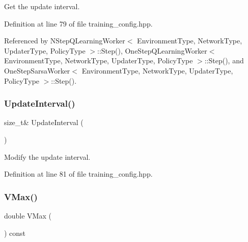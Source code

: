 Get the update interval. 



Definition at line 79 of file training\+\_\+config.\+hpp.



Referenced by N\+Step\+Q\+Learning\+Worker$<$ Environment\+Type, Network\+Type, Updater\+Type, Policy\+Type $>$\+::\+Step(), One\+Step\+Q\+Learning\+Worker$<$ Environment\+Type, Network\+Type, Updater\+Type, Policy\+Type $>$\+::\+Step(), and One\+Step\+Sarsa\+Worker$<$ Environment\+Type, Network\+Type, Updater\+Type, Policy\+Type $>$\+::\+Step().

\mbox{\label{classmlpack_1_1rl_1_1TrainingConfig_a8ff4385395b639358c1e392696a7469f}} 
\subsubsection{Update\+Interval()\hspace{0.1cm}{\footnotesize\ttfamily [2/2]}}
{\footnotesize\ttfamily size\+\_\+t\& Update\+Interval (\begin{DoxyParamCaption}{ }\end{DoxyParamCaption})\hspace{0.3cm}{\ttfamily [inline]}}



Modify the update interval. 



Definition at line 81 of file training\+\_\+config.\+hpp.

\mbox{\label{classmlpack_1_1rl_1_1TrainingConfig_af17fe4b8e0837c2280c72c08513a0da0}} 
\subsubsection{V\+Max()\hspace{0.1cm}{\footnotesize\ttfamily [1/2]}}
{\footnotesize\ttfamily double V\+Max (\begin{DoxyParamCaption}{ }\end{DoxyParamCaption}) const\hspace{0.3cm}{\ttfamily [inline]}}



